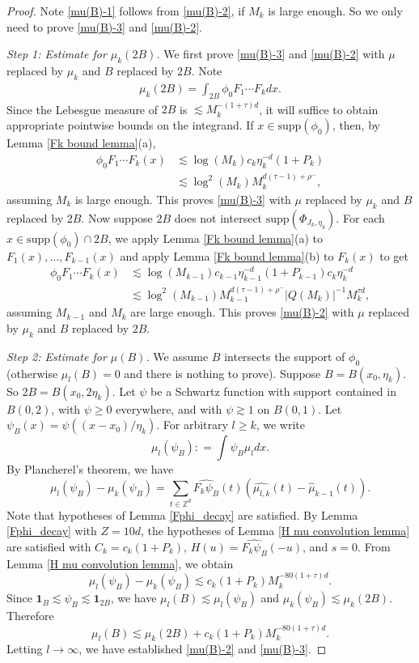 \documentclass{amsart}
\numberwithin{equation}{section}
\theoremstyle{definition}
\theoremstyle{definition}
\def\ZZ{\mathbb{Z}}
\def\supp{\mathrm{supp}}
\def\one{\mathbf{1}}
\begin{document}
\begin{proof}
Note \eqref{mu(B)-1} follows from \eqref{mu(B)-2}, if $M_k$ is large enough. So we only need to prove \eqref{mu(B)-3} and \eqref{mu(B)-2}. 

\textit{Step 1: Estimate for $\mu_k(2B)$.} 
We first prove \eqref{mu(B)-3} and \eqref{mu(B)-2} with $\mu$ replaced by $\mu_k$ and $B$ replaced by $2B$. 
Note 
\begin{align*}
\mu_k(2B) = \int_{2B} \phi_0 F_1 \cdots F_k dx. 
\end{align*}
Since the Lebesgue measure of $2B$ is $\lesssim M_k^{-(1+\tau)d}$, it will suffice to obtain appropriate pointwise bounds on the integrand.   
%
If $x \in \supp(\phi_0)$, then, by Lemma \ref{Fk bound lemma}(a), 
\begin{align*}
\phi_0 F_1 \cdots F_k(x) 
&\lesssim \log(M_k) c_k \eta_k^{-d}(1+P_k) \\
\nonumber 
&\lesssim \log^2(M_k) 
M_k^{d(\tau-1)+\rho^-}, 
\end{align*}
assuming $M_k$ is large enough. 
This proves \eqref{mu(B)-3} with $\mu$ replaced by $\mu_k$ and $B$ replaced by $2B$.  
%
Now suppose $2B$ does not intersect $\supp(\Phi_{J_k,\eta_k})$. 
For each $x \in \supp(\phi_0) \cap 2B$, we apply Lemma \ref{Fk bound lemma}(a) to $F_1(x), \ldots, F_{k-1}(x)$ and apply Lemma \ref{Fk bound lemma}(b) to $F_k(x)$ to get  
\begin{align*}
\phi_0 F_1 \cdots F_k(x) &\lesssim  \log(M_{k-1}) c_{k-1} \eta_{k-1}^{-d} (1+P_{k-1}) c_{k} \eta_{k}^{-d} \\
\nonumber 
&\lesssim \log^2(M_{k-1}) 
M_{k-1}^{d(\tau-1)+\rho^-}
|Q(M_k)|^{-1}M_k^{\tau d}, 
\end{align*}
assuming $M_{k-1}$ and $M_k$ are large enough. 
This proves \eqref{mu(B)-2} with $\mu$ replaced by $\mu_k$ and $B$ replaced by $2B$. 


\textit{Step 2: Estimate for $\mu(B)$.} 
We assume $B$ intersects the support of $\phi_0$ (otherwise $\mu_l(B)=0$ and there is nothing to prove). 
Suppose $B = B(x_0,\eta_k)$. So $2B = B(x_0,2\eta_k)$. 
Let $\psi$ be a Schwartz function with support contained in $B(0,2)$, with $\psi \geq 0$ everywhere, and with $\psi \gtrsim 1$ on $B(0,1)$.
Let $\psi_{B}(x) = \psi((x-x_0)/\eta_k)$. 
For arbitrary $l \geq k$, we write
$$
\mu_l(\psi_B) : = \int \psi_B \mu_l dx.
$$
By Plancherel's theorem, we have
$$
\mu_l(\psi_B) - \mu_k (\psi_B)= \sum_{t \in \ZZ^d} \widehat{F_k\psi_B} (t) (\widehat{\mu_{l,k}} (t) - \widehat{\mu}_{k-1}(t)). 
$$
Note that hypotheses of Lemma \ref{Fphi_decay} are satisfied. 
By Lemma \ref{Fphi_decay} with $Z=10d$, the hypotheses of 
Lemma \ref{H mu convolution lemma} are satisfied with $C_k = c_k (1+P_k)$, $H(u) = \widehat{F_k \psi_B}(-u)$, and $s=0$. From Lemma \ref{H mu convolution lemma}, we obtain 
$$
\mu_l(\psi_B) - \mu_k(\psi_B) \lesssim c_k (1+P_k) M_k^{-80(1+\tau)d}.
$$
Since $\one_{B} \lesssim \psi_B \lesssim \one_{2B}$, we have $\mu_{l}(B) \lesssim \mu_{l}(\psi_B)$
and 
$\mu_k(\psi_B) \lesssim \mu_k(2B)$. 
Therefore 
$$
\mu_l(B) 
\lesssim \mu_k(2B) + c_k (1+P_k) M_k^{-80(1+\tau)d}.
$$
Letting $l \rightarrow \infty$, we have established 
\eqref{mu(B)-2} and \eqref{mu(B)-3}. 
\end{proof}
\end{document}
